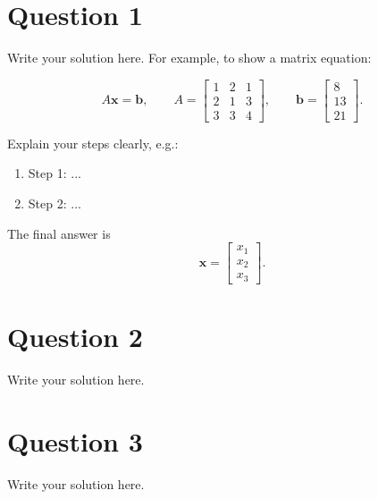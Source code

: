 \documentclass[12pt,a4paper]{article}
\begin{document}

\section*{Question 1}

Write your solution here. For example, to show a matrix equation:

\[
A\mathbf{x} = \mathbf{b},
\qquad
A =
\begin{bmatrix}
1 & 2 & 1\\
2 & 1 & 3\\
3 & 3 & 4
\end{bmatrix},
\qquad
\mathbf{b} =
\begin{bmatrix}
8\\
13\\
21
\end{bmatrix}.
\]

Explain your steps clearly, e.g.:

\begin{enumerate}
    \item Step 1: ...
    \item Step 2: ...
\end{enumerate}

The final answer is
\[
\mathbf{x} = \begin{bmatrix} x_1\\ x_2\\ x_3 \end{bmatrix}.
\]

\section*{Question 2}

Write your solution here.

\section*{Question 3}

Write your solution here.
\end{document}
